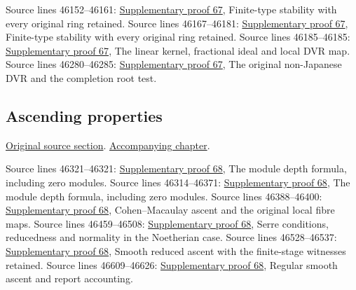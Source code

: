 \begin{AlgebraSourceRoutes}
 Source lines 46152--46161: \hyperlink{algebra_nagata_notes_20260929}{Supplementary proof 67}, Finite-type stability with every original ring retained.
 Source lines 46167--46181: \hyperlink{algebra_nagata_notes_20260929}{Supplementary proof 67}, Finite-type stability with every original ring retained.
 Source lines 46185--46185: \hyperlink{algebra_nagata_notes_20260929}{Supplementary proof 67}, The linear kernel, fractional ideal and local DVR map.
 Source lines 46280--46285: \hyperlink{algebra_nagata_notes_20260929}{Supplementary proof 67}, The original non-Japanese DVR and the completion root test.
\end{AlgebraSourceRoutes}

\subsection{Ascending properties}
\hypertarget{algebra-source-section-ascending-properties}{}
\noindent\href{https://github.com/stacks/stacks-project/blob/a04446e57ec1fbc252a871afcec7752fb2807b14/algebra.tex\#L46293}{Original source section}. \href{algebra.pdf\#nameddest=section-ascending-properties}{Accompanying chapter}.

\begin{AlgebraSourceRoutes}
 Source lines 46321--46321: \hyperlink{algebra_ascent_notes_20260929}{Supplementary proof 68}, The module depth formula, including zero modules.
 Source lines 46314--46371: \hyperlink{algebra_ascent_notes_20260929}{Supplementary proof 68}, The module depth formula, including zero modules.
 Source lines 46388--46400: \hyperlink{algebra_ascent_notes_20260929}{Supplementary proof 68}, Cohen–Macaulay ascent and the original local fibre maps.
 Source lines 46459--46508: \hyperlink{algebra_ascent_notes_20260929}{Supplementary proof 68}, Serre conditions, reducedness and normality in the Noetherian case.
 Source lines 46528--46537: \hyperlink{algebra_ascent_notes_20260929}{Supplementary proof 68}, Smooth reduced ascent with the finite-stage witnesses retained.
 Source lines 46609--46626: \hyperlink{algebra_ascent_notes_20260929}{Supplementary proof 68}, Regular smooth ascent and report accounting.
\end{AlgebraSourceRoutes}

